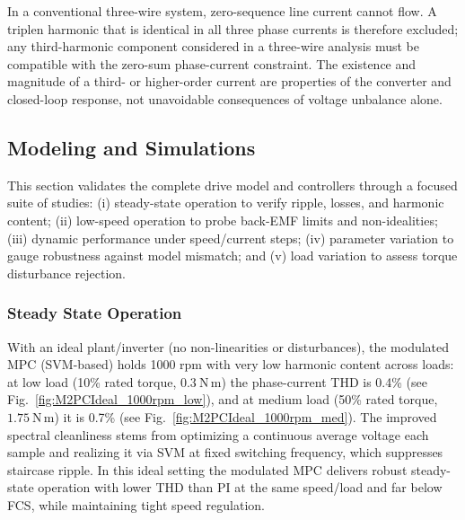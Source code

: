 In a conventional three-wire system, zero-sequence line current cannot flow. A triplen harmonic that is identical in all three phase currents is therefore excluded; any third-harmonic component considered in a three-wire analysis must be compatible with the zero-sum phase-current constraint. The existence and magnitude of a third- or higher-order current are properties of the converter and closed-loop response, not unavoidable consequences of voltage unbalance alone.

\newpage
\subsection{Modeling and Simulations}
This section validates the complete drive model and controllers through a focused suite of studies: (i) steady-state operation to verify ripple, losses, and harmonic content; (ii) low-speed operation to probe back-EMF limits and non-idealities; (iii)  dynamic performance under speed/current steps; (iv) parameter variation to gauge robustness against model mismatch; and (v) load variation to assess torque disturbance rejection.
\subsubsection{Steady State Operation}
With an ideal plant/inverter (no non-linearities or disturbances), the modulated MPC (SVM-based) holds 1000 rpm with very low harmonic content across loads: at low load (10\% rated torque, \(0.3~\mathrm{N\,m}\)) the phase-current THD is 0.4\% (see Fig.~\ref{fig:M2PCIdeal_1000rpm_low}), and at medium load (50\% rated torque, \(1.75~\mathrm{N\,m}\)) it is 0.7\% (see Fig.~\ref{fig:M2PCIdeal_1000rpm_med}). The improved spectral cleanliness stems from optimizing a continuous average voltage each sample and realizing it via SVM at fixed switching frequency, which suppresses staircase ripple. In this ideal setting the modulated MPC delivers robust steady-state operation with lower THD than PI at the same speed/load and far below FCS, while maintaining tight speed regulation.

